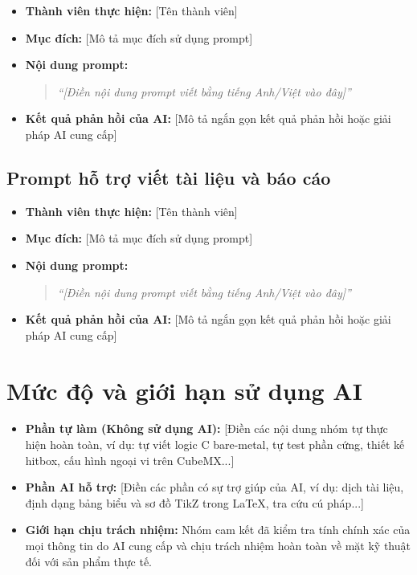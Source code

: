 \documentclass[a4paper,12pt]{report}
\begin{document}
\begin{itemize}
    \item \textbf{Thành viên thực hiện:} [Tên thành viên]
    \item \textbf{Mục đích:} [Mô tả mục đích sử dụng prompt]
    \item \textbf{Nội dung prompt:}
    \begin{quote}
    \textit{``[Điền nội dung prompt viết bằng tiếng Anh/Việt vào đây]''}
    \end{quote}
    \item \textbf{Kết quả phản hồi của AI:} [Mô tả ngắn gọn kết quả phản hồi hoặc giải pháp AI cung cấp]
\end{itemize}

\subsection{Prompt hỗ trợ viết tài liệu và báo cáo}

\begin{itemize}
    \item \textbf{Thành viên thực hiện:} [Tên thành viên]
    \item \textbf{Mục đích:} [Mô tả mục đích sử dụng prompt]
    \item \textbf{Nội dung prompt:}
    \begin{quote}
    \textit{``[Điền nội dung prompt viết bằng tiếng Anh/Việt vào đây]''}
    \end{quote}
    \item \textbf{Kết quả phản hồi của AI:} [Mô tả ngắn gọn kết quả phản hồi hoặc giải pháp AI cung cấp]
\end{itemize}

\section{Mức độ và giới hạn sử dụng AI}

\begin{itemize}
    \item \textbf{Phần tự làm (Không sử dụng AI):} [Điền các nội dung nhóm tự thực hiện hoàn toàn, ví dụ: tự viết logic C bare-metal, tự test phần cứng, thiết kế hitbox, cấu hình ngoại vi trên CubeMX...]
    \item \textbf{Phần AI hỗ trợ:} [Điền các phần có sự trợ giúp của AI, ví dụ: dịch tài liệu, định dạng bảng biểu và sơ đồ TikZ trong LaTeX, tra cứu cú pháp...]
    \item \textbf{Giới hạn chịu trách nhiệm:} Nhóm cam kết đã kiểm tra tính chính xác của mọi thông tin do AI cung cấp và chịu trách nhiệm hoàn toàn về mặt kỹ thuật đối với sản phẩm thực tế.
\end{itemize}

\end{document}
